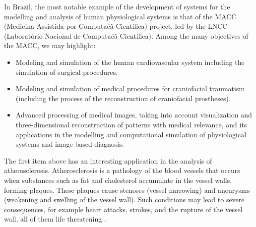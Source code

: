 In Brazil, the most notable example of the development of systems for the modelling and analysis of human physiological systems is that of the MACC (Medicina Assistida por Computa\'c\~a Cient\'ifica) project, led by the LNCC (Laborat\'orio Nacional de Computa\'c\~a Cient\'ifica). Among the many objectives of the MACC, we may highlight: 

\begin{itemize}
\item Modeling and simulation of the human cardiovascular system including the simulation of surgical procedures.
\item Modeling and simulation of medical procedures for craniofacial traumatism (including the process of the reconstruction of craniofacial prostheses).
\item Advanced processing of medical images, taking into account visualization and three-dimensional reconstruction of patterns with medical relevance, and its applications in the modelling and computational simulation of physiological systems and image based diagnosis.
\end{itemize}

The first item above has an interesting application in the analysis of atherosclerosis. Atherosclerosis is a pathology of the blood vessels that occurs when substances such as fat and cholesterol accumulate in the vessel walls, forming plaques. These plaques cause stenoses (vessel narrowing) and aneurysms (weakening and swelling of the vessel wall). Such conditions may lead to severe consequences, for example heart attacks, strokes, and the rupture of the vessel wall, all of them life threatening \citep{Gennest,Libby}.

